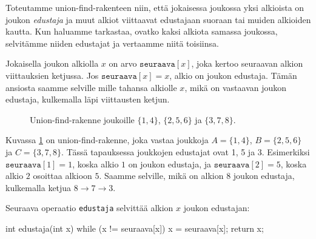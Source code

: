Toteutamme union-find-rakenteen niin, että jokaisessa joukossa
yksi alkioista on joukon \emph{edustaja} ja muut alkiot viittaavat
edustajaan suoraan tai muiden alkioiden kautta.
Kun haluamme tarkastaa, ovatko kaksi alkiota samassa joukossa,
selvitämme niiden edustajat ja vertaamme niitä toisiinsa.

Jokaisella joukon alkiolla $x$ on arvo $\texttt{seuraava}[x]$,
joka kertoo seuraavan alkion viittauksien ketjussa.
Jos $\texttt{seuraava}[x]=x$, alkio on joukon edustaja.
Tämän ansiosta saamme selville mille tahansa alkiolle $x$,
mikä on vastaavan joukon edustaja, kulkemalla läpi viittausten ketjun.

\begin{figure}
\center
\begin{center}
\end{center}
\caption{Union-find-rakenne joukoille $\{1,4\}$, $\{2,5,6\}$ ja $\{3,7,8\}$.}
\label{fig:unifin}
\end{figure}

Kuvassa \ref{fig:unifin} on union-find-rakenne,
joka vastaa joukkoja $A=\{1,4\}$, $B=\{2,5,6\}$ ja $C=\{3,7,8\}$.
Tässä tapauksessa joukkojen edustajat ovat 1, 5 ja 3.
Esimerkiksi $\texttt{seuraava}[1]=1$, koska alkio $1$ on joukon edustaja,
ja $\texttt{seuraava}[2]=5$, koska alkio $2$ osoittaa alkioon $5$.
Saamme selville, mikä on alkion 8 joukon edustaja, kulkemalla ketjua
$8 \rightarrow 7 \rightarrow 3$.

Seuraava operaatio \texttt{edustaja} selvittää alkion $x$ joukon edustajan:

\begin{code}
int edustaja(int x) {
    while (x != seuraava[x]) {
        x = seuraava[x];
    }
    return x;
}
\end{code}

